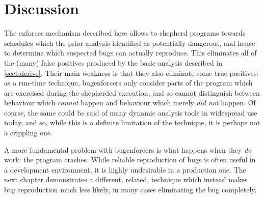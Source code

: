 \section{Discussion}

The enforcer mechanism described here allows {\technique} to shepherd
programs towards schedules which the prior analysis identified as
potentially dangerous, and hence to determine which suspected bugs can
actually reproduce.  This eliminates all of the (many) false positives
produced by the basic analysis described in \autoref{sect:derive}.
Their main weakness is that they also eliminate some true positives:
as a run-time technique, \glspl{bugenforcer} only consider parts of
the program which are exercised during the shepherded execution, and
so cannot distinguish between behaviour which \emph{cannot} happen and
behaviour which merely \emph{did not} happen.  Of course, the same
could be said of many dynamic analysis tools in widespread use
today, and so, while this is a definite limitation of the technique,
it is perhaps not a crippling one.

A more fundamental problem with \glspl{bugenforcer} is what happens
when they \emph{do} work: the program crashes.  While reliable
reproduction of bugs is often useful in a development environment, it
is highly undesirable in a production one.  The next chapter
demonstrates a different, related, technique which instead makes bug
reproduction much less likely, in many cases eliminating the bug
completely.

